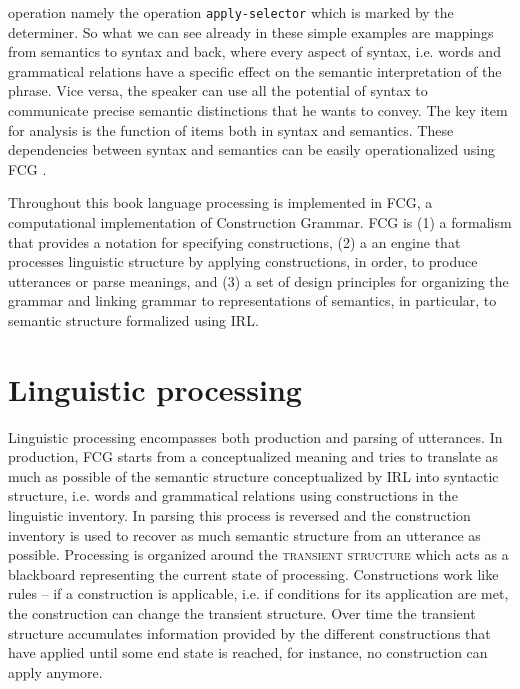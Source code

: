 operation namely the operation {\footnotesize\tt apply-selector}
which is marked by the determiner. So what we can see already in 
these simple examples are mappings 
from semantics to syntax and back, where every aspect of syntax,
i.e. words and grammatical relations
have a specific effect on the semantic interpretation of the phrase.
Vice versa, the speaker can use all the potential of syntax to
communicate precise semantic distinctions that he wants to convey.
The key item for analysis is the function of items 
both in syntax and semantics. 
These dependencies between syntax and semantics can be easily
operationalized using FCG
\citep{beule2005hierarchy,steels2005linking}. 

Throughout this book language processing is implemented
in FCG, a computational implementation of Construction Grammar. FCG is (1) a formalism
that provides a notation for specifying constructions, (2) a
an engine that processes linguistic structure by applying constructions, 
in order, to produce utterances or parse meanings, and (3) a set of design principles
for organizing the grammar and linking grammar to 
representations of semantics, in particular, to semantic structure 
formalized using IRL. 

\section{Linguistic processing}
Linguistic processing encompasses both production and parsing
of utterances. In production, FCG starts from a conceptualized
meaning and tries to translate as much as possible of
the semantic structure conceptualized by IRL into syntactic structure, 
i.e. words and grammatical relations using constructions in the linguistic inventory. 
In parsing this process is reversed and the construction inventory is used
to recover as much semantic structure from an utterance as possible.
Processing is organized around the \textsc{transient structure}
which acts as a blackboard representing the current state of processing.
Constructions work like rules -- if a construction is applicable,
i.e. if conditions for its application are met, the construction
can change the transient structure.
Over time the transient structure accumulates information provided by the different constructions
that have applied until some end state is reached, for instance,
no construction can apply anymore.

